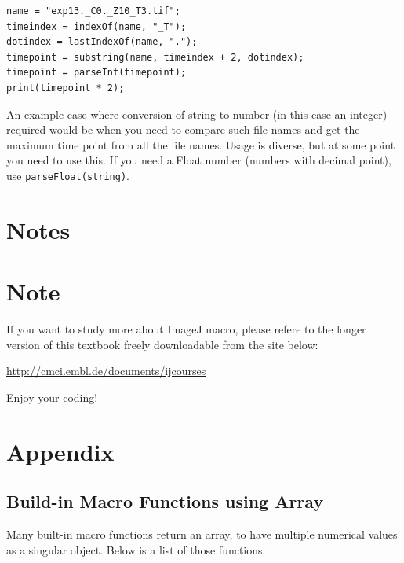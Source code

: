 \documentclass[11pt,a4paper,oneside]{report}
\newcommand{\ilcom}[1]{\texttt{\small#1}}
\begin{document}
\begin{lstlisting}
name = "exp13._C0._Z10_T3.tif";
timeindex = indexOf(name, "_T");
dotindex = lastIndexOf(name, ".");
timepoint = substring(name, timeindex + 2, dotindex);
timepoint = parseInt(timepoint);
print(timepoint * 2);
\end{lstlisting}

An example case where conversion of string to number (in this case an integer) required would be when you need to compare such file names and get the maximum time point from all the file names. Usage is diverse, but at some point you need to use this. If you need a Float number (numbers with decimal point), use \ilcom{parseFloat(string)}.
 
\newpage

\section{Notes}
\label{sec:notes}

\section{Note}

If you want to study more about ImageJ macro, please refere to the longer version of this textbook freely downloadable from the site below:

\url{http://cmci.embl.de/documents/ijcourses}

Enjoy your coding! 
\section{Appendix}

\subsection{Build-in Macro Functions using Array}
\label{subsec:arrayreturn}
Many built-in macro functions return an array, to have multiple numerical values as a singular object. Below is a list of those functions. 
\end{document}
